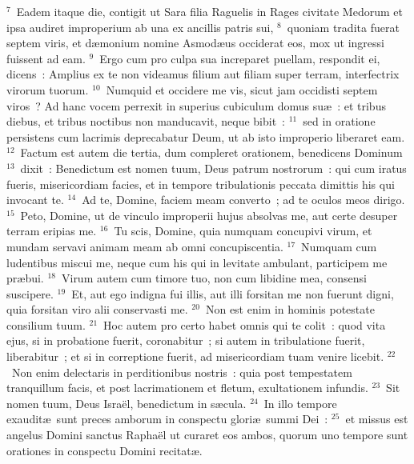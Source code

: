 ${}^{7}$~Eadem itaque die, contigit ut Sara filia Raguelis in Rages civitate Medorum et ipsa audiret improperium ab una ex ancillis patris sui,
${}^{8}$~quoniam tradita fuerat septem viris, et d\ae monium nomine Asmod\ae us occiderat eos, mox ut ingressi fuissent ad eam.
${}^{9}$~Ergo cum pro culpa sua increparet puellam, respondit ei, dicens~: Amplius ex te non videamus filium aut filiam super terram, interfectrix virorum tuorum.
${}^{10}$~Numquid et occidere me vis, sicut jam occidisti septem viros~? Ad hanc vocem perrexit in superius cubiculum domus su\ae~: et tribus diebus, et tribus noctibus non manducavit, neque bibit~:
${}^{11}$~sed in oratione persistens cum lacrimis deprecabatur Deum, ut ab isto improperio liberaret eam.
${}^{12}$~Factum est autem die tertia, dum compleret orationem, benedicens Dominum
${}^{13}$~dixit~: Benedictum est nomen tuum, Deus patrum nostrorum~: qui cum iratus fueris, misericordiam facies, et in tempore tribulationis peccata dimittis his qui invocant te.
${}^{14}$~Ad te, Domine, faciem meam converto~; ad te oculos meos dirigo.
${}^{15}$~Peto, Domine, ut de vinculo improperii hujus absolvas me, aut certe desuper terram eripias me.
${}^{16}$~Tu scis, Domine, quia numquam concupivi virum, et mundam servavi animam meam ab omni concupiscentia.
${}^{17}$~Numquam cum ludentibus miscui me, neque cum his qui in levitate ambulant, participem me pr\ae bui.
${}^{18}$~Virum autem cum timore tuo, non cum libidine mea, consensi suscipere.
${}^{19}$~Et, aut ego indigna fui illis, aut illi forsitan me non fuerunt digni, quia forsitan viro alii conservasti me.
${}^{20}$~Non est enim in hominis potestate consilium tuum.
${}^{21}$~Hoc autem pro certo habet omnis qui te colit~: quod vita ejus, si in probatione fuerit, coronabitur~; si autem in tribulatione fuerit, liberabitur~; et si in correptione fuerit, ad misericordiam tuam venire licebit.
${}^{22}$~Non enim delectaris in perditionibus nostris~: quia post tempestatem tranquillum facis, et post lacrimationem et fletum, exultationem infundis.
${}^{23}$~Sit nomen tuum, Deus Isra\"el, benedictum in s\ae cula.
${}^{24}$~In illo tempore exaudit\ae\ sunt preces amborum in conspectu glori\ae\ summi Dei~:
${}^{25}$~et missus est angelus Domini sanctus Rapha\"el ut curaret eos ambos, quorum uno tempore sunt orationes in conspectu Domini recitat\ae .

